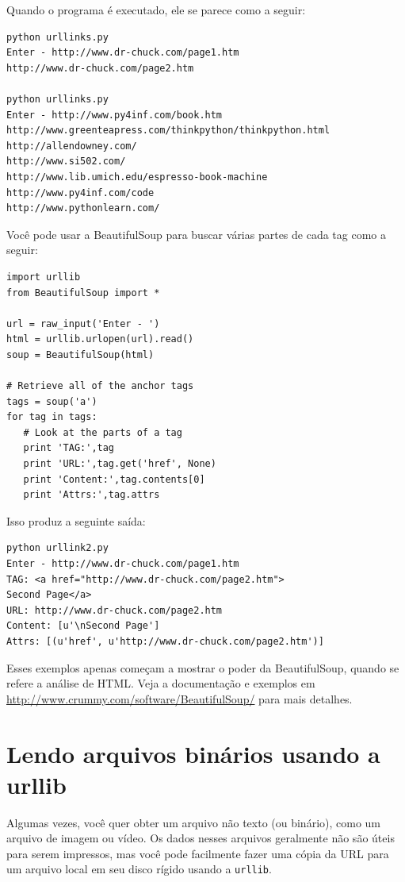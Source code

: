Quando o programa é executado, ele se parece como a seguir:

\beforeverb
\begin{verbatim}
python urllinks.py 
Enter - http://www.dr-chuck.com/page1.htm
http://www.dr-chuck.com/page2.htm

python urllinks.py 
Enter - http://www.py4inf.com/book.htm
http://www.greenteapress.com/thinkpython/thinkpython.html
http://allendowney.com/
http://www.si502.com/
http://www.lib.umich.edu/espresso-book-machine
http://www.py4inf.com/code
http://www.pythonlearn.com/
\end{verbatim}
\afterverb
%
Você pode usar a BeautifulSoup para buscar várias partes de cada 
tag como a seguir:

\beforeverb
\begin{verbatim}
import urllib
from BeautifulSoup import *

url = raw_input('Enter - ')
html = urllib.urlopen(url).read()
soup = BeautifulSoup(html)

# Retrieve all of the anchor tags
tags = soup('a')
for tag in tags:
   # Look at the parts of a tag
   print 'TAG:',tag
   print 'URL:',tag.get('href', None)
   print 'Content:',tag.contents[0]
   print 'Attrs:',tag.attrs
\end{verbatim}
\afterverb
%
Isso produz a seguinte saída:

\beforeverb
\begin{verbatim}
python urllink2.py 
Enter - http://www.dr-chuck.com/page1.htm
TAG: <a href="http://www.dr-chuck.com/page2.htm">
Second Page</a>
URL: http://www.dr-chuck.com/page2.htm
Content: [u'\nSecond Page']
Attrs: [(u'href', u'http://www.dr-chuck.com/page2.htm')]
\end{verbatim}
\afterverb
%
Esses exemplos apenas começam a mostrar o poder da BeautifulSoup,
quando se refere a análise de HTML.  Veja a documentação e exemplos
em
\url{http://www.crummy.com/software/BeautifulSoup/} para mais detalhes.

\section{Lendo arquivos binários usando a urllib}

Algumas vezes, você quer obter um arquivo não texto (ou binário), como
um arquivo de imagem ou vídeo. Os dados nesses arquivos geralmente não
são úteis para serem impressos, mas você pode facilmente fazer uma cópia
da URL para um arquivo local em seu disco rígido usando a {\tt urllib}.

